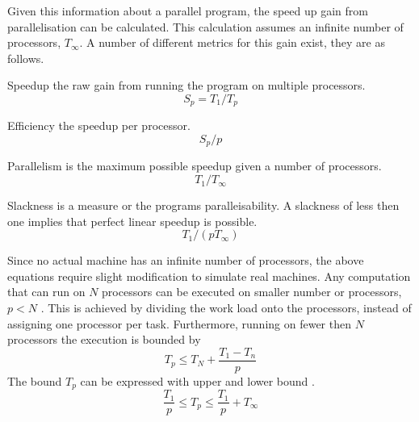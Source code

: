 Given this information about a parallel program, the speed up gain from parallelisation can be calculated. This calculation assumes an infinite number of processors, $T_\infty$. A number of different metrics for this gain exist, they are as follows.
\begin{labeling}{\quad\quad}
    \item[Speedup] the raw gain from running the program on multiple processors.
    \begin{equation}
        S_p = T_1/T_p
    \end{equation}
    \item[Efficiency] the speedup per processor.
    \begin{equation}
        S_p/p
    \end{equation}
    \item[Parallelism] is the maximum possible speedup given a number of processors.
    \begin{equation}
        T_1/T_\infty
    \end{equation}
    \item[Slackness] is a measure or the programs paralleisability. A slackness of less then one implies that perfect linear speedup is possible.
    \begin{equation}
        T_1/(pT_\infty)
    \end{equation}
\end{labeling}
Since no actual machine has an infinite number of processors, the above equations require slight modification to simulate real machines. Any computation that can run on $N$ processors can be executed on smaller number or processors, $p < N$ \cite{Gustafson2011}. This is achieved by dividing the work load onto the processors, instead of assigning one processor per task. Furthermore, running on fewer then $N$ processors the execution is bounded by
\begin{equation}
    T_p \leq T_N + \frac{T_1 - T_n}{p}
\end{equation}
The bound $T_p$ can be expressed with upper and lower bound \cite{brent1974parallel}.
\begin{equation}
    \frac{T_1}{p} \leq T_p \leq \frac{T_1}{p} + T_\infty
\end{equation}